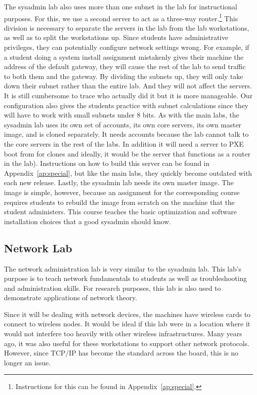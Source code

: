 The sysadmin lab also uses more than one subnet in the lab for instructional purposes.  For this, we use a second server to act as a three-way router.\footnote{Instructions for this can be found in Appendix~\ref{ap:special}.}  This division is necessary to separate the servers in the lab from the lab workstations, as well as to split the workstations up.  Since students have administrative privileges, they can potentially configure network settings wrong.  For example, if a student doing a system install assignment mistakenly gives their machine the address of the default gateway, they will cause the rest of the lab to send traffic to both them and the gateway.  By dividing the subnets up, they will only take down their subnet rather than the entire lab.  And they will not affect the servers.  It is still cumbersome to trace who actually did it but it is more manageable.  Our configuration also gives the students practice with subnet calculations since they will have to work with small subnets under 8 bits.
\vfill\eject
As with the main labs, the sysadmin lab uses its own set of accounts, its own core servers, its own master image, and is cloned separately.  It needs accounts because the lab cannot talk to the core servers in the rest of the labs.  In addition it will need a server to PXE boot from for clones and ideally, it would be the server that functions as a router in the lab).  Instructions on how to build this server can be found in Appendix~\ref{ap:special}, but like the main labs, they quickly become outdated with each new release.  Lastly, the sysadmin lab needs its own master image.  The image is simple, however, because an assignment for the corresponding course requires students to rebuild the image from scratch on the machine that the student administers.  This course teaches the basic optimization and software installation choices that a good sysadmin should know.  

\subsection{Network Lab}
The network administration lab is very similar to the sysadmin lab.  This lab's purpose is to teach network fundamentals to students as well as troubleshooting and administration skills.  For research purposes, this lab is also used to demonstrate applications of network theory.  

Since it will be dealing with network devices, the machines have wireless cards to connect to wireless nodes.  It would be ideal if this lab were in a location where it would not interfere too heavily with other wireless infrastructures.  Many years ago, it was also useful for these workstations to support other network protocols.  However, since TCP/IP has become the standard across the board, this is no longer an issue.  

